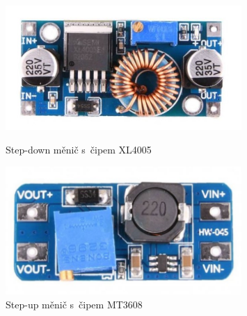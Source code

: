 \begin{figure}[htb]
  \centering
  \begin{minipage}{0.45\textwidth}
    \centering
  \includegraphics[width=0.8\textwidth]{img/XL4005.jpg}
  \caption{\label{fig:XL4005} Step-down měnič s~čipem XL4005~\cite{laskakit-XL4005}}
  \end{minipage}\hfill
  \begin{minipage}{0.45\textwidth}
    \centering
  \includegraphics[width=0.8\textwidth]{img/MT3608.jpg}
  \caption{\label{fig:MT3608} Step-up měnič s~čipem MT3608~\cite{laskakit-MT3608}}
  \end{minipage}
\end{figure}
